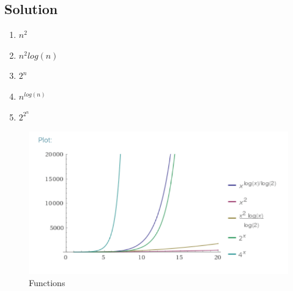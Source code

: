 \subsection{Solution}

\begin{enumerate}
    \item $n^{2}$
    \item $n^{2}log(n)$
    \item $2^{n}$
    \item $n^{log(n)}$
    \item $2^{2^{n}}$
\end{enumerate}

\begin{figure}[h]
    \includegraphics[scale=0.70]{Figures/figure01.png}
    \caption{Functions}
    \centering
\end{figure}
